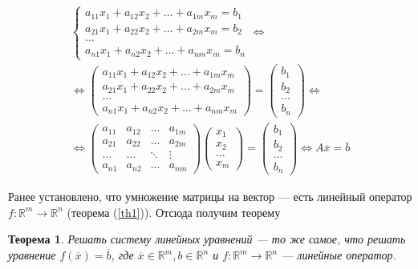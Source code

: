\documentclass[]{article}
\newtheorem{thr}{Теорема}
\begin{document}
\begin{gather*}
	\begin{cases}
		a_{11}x_1 + a_{12}x_2 + \ldots + a_{1m}x_m=b_1
		\\
		a_{21}x_1 + a_{22}x_2 + \ldots + a_{2m}x_m=b_2
		\\
		\ldots
		\\
		a_{n1}x_1 + a_{n2}x_2 + \ldots + a_{nm}x_m=b_n
	\end{cases}
	\Leftrightarrow
	\\
	\Leftrightarrow
	\begin{pmatrix}
	a_{11}x_1 + a_{12}x_2 + \ldots + a_{1m}x_m
	\\
	a_{21}x_1 + a_{22}x_2 + \ldots + a_{2m}x_m
	\\
	\ldots
	\\
	a_{n1}x_1 + a_{n2}x_2 + \ldots + a_{nm}x_m
\end{pmatrix}
=
	\begin{pmatrix}
	b_1
	\\
	b_2
	\\
	\ldots
	\\
	b_n
\end{pmatrix}
\Leftrightarrow
\\
\Leftrightarrow
	\begin{pmatrix}
	a_{11} & a_{12} & \ldots & a_{1m}
	\\
	a_{21} & a_{22} & \ldots & a_{2m}
	\\
	\ldots & \ldots & \ddots & \vdots
	\\
	a_{n1} & a_{n2} & \ldots & a_{nm}
\end{pmatrix}
\begin{pmatrix}
	x_{1}
	\\
	x_{2}
	\\
	\ldots
	\\
	x_{m}
\end{pmatrix}
=
\begin{pmatrix}
	b_1
	\\
	b_2
	\\
	\ldots
	\\
	b_n
\end{pmatrix}
\Leftrightarrow
A\overline{x}=\overline{b}
\end{gather*}

Ранее установлено, что умножение матрицы на вектор --- есть линейный оператор $f:\mathbb{R}^m\rightarrow\mathbb{R}^n$ (теорема (\ref{th1})). Отсюда получим теорему

\begin{thr}
Решать систему линейных уравнений --- то же самое, что решать уравнение $f(\overline{x})=\overline{b}$, где $\overline{x}\in \mathbb{R}^m,b\in\mathbb{R}^n$ и $f:\mathbb{R}^m\rightarrow\mathbb{R}^n$ --- линейные оператор.
\end{thr}
\end{document}
